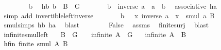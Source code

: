 \begin{isabellebody}
\ \ \isamarkupfalse%
\isanewline
\ \ \ \ \isamarkupfalse%
\ b\ \isamarkupfalse%
\ hb{\isacharcolon}{\kern0pt}\ {\isachardoublequoteopen}b\ {\isasymin}\ B\ {\isasyminter}\ G{\isachardoublequoteclose}\isanewline
\ \ \ \ \isamarkupfalse%
\ \isamarkupfalse%
\ {\isachardoublequoteopen}b\ {\isacharequal}{\kern0pt}\ inverse\ a\ {\isasymcdot}\ {\isacharparenleft}{\kern0pt}a\ {\isasymcdot}\ b{\isacharparenright}{\kern0pt}{\isachardoublequoteclose}\ \isamarkupfalse%
\ associative\ ha\ \isamarkupfalse%
\ {\isacharparenleft}{\kern0pt}simp\ add{\isacharcolon}{\kern0pt}\ invertible{\isacharunderscore}{\kern0pt}left{\isacharunderscore}{\kern0pt}inverse{}{\isacharparenright}{\kern0pt}\isanewline
\ \ \ \ \isamarkupfalse%
\ \isamarkupfalse%
\ {\isachardoublequoteopen}b\ {\isasymin}\ {\isacharparenleft}{\kern0pt}{\isasymlambda}\ x{\isachardot}{\kern0pt}\ inverse\ a\ {\isasymcdot}\ x{\isacharparenright}{\kern0pt}\ {\isacharbackquote}{\kern0pt}\ smul\ {\isacharbraceleft}{\kern0pt}a{\isacharbraceright}{\kern0pt}\ B{\isachardoublequoteclose}\ \isamarkupfalse%
\ smul{\isachardot}{\kern0pt}simps\ hb\ ha\ \isamarkupfalse%
\ blast\isanewline
\ \ \isamarkupfalse%
\isanewline
\ \ \isamarkupfalse%
\ \isamarkupfalse%
\ False\ \isamarkupfalse%
\ assms\ \isamarkupfalse%
\ finite{\isacharunderscore}{\kern0pt}surj\ \isamarkupfalse%
\ blast\isanewline
{}\isamarkupfalse%
%
\endisatagproof
{\isafoldproof}%
%
\isadelimproof
\isanewline
%
\endisadelimproof
\isanewline
{}\isamarkupfalse%
\ infinite{\isacharunderscore}{\kern0pt}smul{\isacharunderscore}{\kern0pt}left{\isacharcolon}{\kern0pt}\isanewline
\ \ \ {\isachardoublequoteopen}B\ {\isasyminter}\ G\ {\isasymnoteq}\ {\isacharbraceleft}{\kern0pt}{\isacharbraceright}{\kern0pt}{\isachardoublequoteclose}\ \ {\isachardoublequoteopen}infinite\ {\isacharparenleft}{\kern0pt}A\ {\isasyminter}\ G{\isacharparenright}{\kern0pt}{\isachardoublequoteclose}\isanewline
\ \ \ {\isachardoublequoteopen}infinite\ {\isacharparenleft}{\kern0pt}A\ {\isasymcdots}\ B{\isacharparenright}{\kern0pt}{\isachardoublequoteclose}\isanewline
%
\isadelimproof
%
\endisadelimproof
%
\isatagproof
{}\isamarkupfalse%
\isanewline
\ \ \isamarkupfalse%
\ hfin{\isacharcolon}{\kern0pt}\ {\isachardoublequoteopen}finite\ {\isacharparenleft}{\kern0pt}smul\ A\ B{\isacharparenright}{\kern0pt}{\isachardoublequoteclose}\isanewline

\end{isabellebody}
